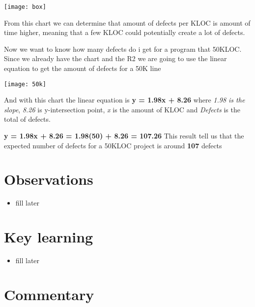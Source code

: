 \begin{center}
    \texttt{[image: box]}    
\end{center}
\noindent
From this chart we can determine that amount of defects per KLOC is amount of time higher, meaning that a few KLOC could potentially create a lot of defects.

\pagebreak
\noindent
Now we want to know how many defects do i get for a program that 50KLOC.
\noindent\newline \newline 
Since we already have the chart and the R2 we are going to use the linear equation to get the amount of defects for a 50K line

\begin{center}
    \texttt{[image: 50k]}    
\end{center}

\noindent\newline 
And with this chart the linear equation is \textbf{y = 1.98x + 8.26} where \textit{1.98 is the slope}, \textit{8.26} is y-intersection point, \textit{x} is the amount of KLOC and \textit{Defects} is the total of defects.

\noindent\newline \newline
\textbf{y = 1.98x + 8.26 = 1.98(50) + 8.26 = 107.26}
\noindent\newline\newline 
This result tell us that the expected number of defects for a 50KLOC project is around \textbf{107} defects

\pagebreak



\section{Observations}
\begin{itemize}
    \item fill later
\end{itemize}
\pagebreak

\section{Key learning}
\begin{itemize}
    \item fill later
\end{itemize}

\pagebreak

\section{Commentary}
